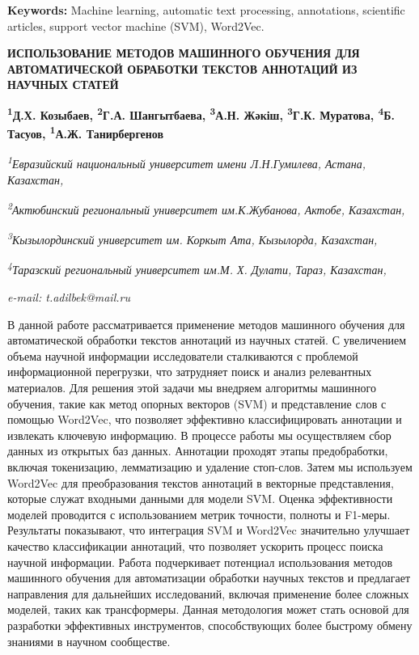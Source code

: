 {\bfseries Keywords:} Machine learning, automatic text processing,
annotations, scientific articles, support vector machine (SVM),
Word2Vec.

\begin{articleheader}
{\bfseries ИСПОЛЬЗОВАНИЕ МЕТОДОВ МАШИННОГО ОБУЧЕНИЯ ДЛЯ АВТОМАТИЧЕСКОЙ ОБРАБОТКИ ТЕКСТОВ АННОТАЦИЙ ИЗ НАУЧНЫХ СТАТЕЙ}

{\bfseries
\textsuperscript{1}Д.Х. Козыбаев,
\textsuperscript{2}Г.А. Шангытбаева,
\textsuperscript{3}А.Н. Жәкіш,
\textsuperscript{3}Г.К. Муратова,
\textsuperscript{4}Б. Тасуов,
\textsuperscript{1}А.Ж. Танирбергенов\textsuperscript{\envelope }}
\end{articleheader}

\begin{affiliation}
\emph{\textsuperscript{1}Евразийский национальный университет имени Л.Н.Гумилева, Астана, Казахстан,}

\emph{\textsuperscript{2}Актюбинский региональный университет им.К.Жубанова, Актобе, Казахстан,}

\emph{\textsuperscript{3}Кызылординский университет им. Коркыт Ата, Кызылорда, Казахстан,}

\emph{\textsuperscript{4}Таразский региональный университет им.М. Х. Дулати, Тараз, Казахстан,}

\emph{e-mail: t.adilbek@mail.ru}
\end{affiliation}

В данной работе рассматривается применение методов машинного обучения
для автоматической обработки текстов аннотаций из научных статей. С
увеличением объема научной информации исследователи сталкиваются с
проблемой информационной перегрузки, что затрудняет поиск и анализ
релевантных материалов. Для решения этой задачи мы внедряем алгоритмы
машинного обучения, такие как метод опорных векторов (SVM) и
представление слов с помощью Word2Vec, что позволяет эффективно
классифицировать аннотации и извлекать ключевую информацию. В процессе
работы мы осуществляем сбор данных из открытых баз данных. Аннотации
проходят этапы предобработки, включая токенизацию, лемматизацию и
удаление стоп-слов. Затем мы используем Word2Vec для преобразования
текстов аннотаций в векторные представления, которые служат входными
данными для модели SVM. Оценка эффективности моделей проводится с
использованием метрик точности, полноты и F1-меры. Результаты
показывают, что интеграция SVM и Word2Vec значительно улучшает качество
классификации аннотаций, что позволяет ускорить процесс поиска научной
информации. Работа подчеркивает потенциал использования методов
машинного обучения для автоматизации обработки научных текстов и
предлагает направления для дальнейших исследований, включая применение
более сложных моделей, таких как трансформеры. Данная методология может
стать основой для разработки эффективных инструментов, способствующих
более быстрому обмену знаниями в научном сообществе.

